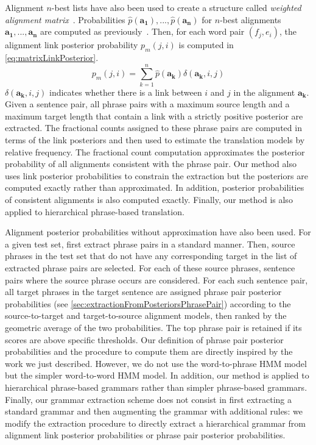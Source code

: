 Alignment $n$-best lists have also been used to create a
structure called
\emph{weighted alignment matrix}~\citep{liu-xia-xiao-liu:2009:EMNLP}.
Probabilities $\hat{p}(\bm{a_1}), ..., \hat{p}(\bm{a_n})$
for $n$-best alignments $\bm{a_1}, ..., \bm{a_n}$ are computed
as previously~\citep{venugopal-zollmann-smith-vogel:2008:AMTA}.
Then, for each word pair $(f_j, e_i)$, the alignment link posterior
probability $p_m(j, i)$ is computed in \autoref{eq:matrixLinkPosterior}.
%
\begin{equation}
  p_m(j, i) = \sum_{k = 1}^n \hat{p}(\bm{a_k}) \delta(\bm{a_k}, i, j)
  \label{eq:matrixLinkPosterior}
\end{equation}
%
$\delta(\bm{a_k}, i, j)$ indicates whether there is a link between $i$ and
$j$ in the alignment $\bm{a_k}$. Given a sentence pair, all phrase
pairs with a maximum source length and a maximum target length that
contain a link with a strictly positive posterior are extracted. The
fractional counts assigned to these phrase pairs are computed in terms
of the link posteriors and then used to estimate the translation models
by relative frequency. The fractional count computation approximates
the posterior probability of all alignments consistent with the phrase
pair. Our method also uses link posterior probabilities
to constrain the extraction but the posteriors are computed
exactly rather than approximated. In addition, posterior probabilities
of consistent alignments is also computed exactly. Finally, our method
is also applied to hierarchical phrase-based translation.

Alignment posterior probabilities without approximation have also been
used.
For a given test set, \citet{deng-and-byrne:2008:ASLP} first extract
phrase pairs in a standard manner. Then, source phrases in the test set
that do not have any corresponding target in the list of extracted
phrase pairs are selected. For each of these source phrases, sentence
pairs where the source phrase occurs are considered. For each such
sentence pair, all target phrases in the target sentence are assigned
phrase pair posterior
probabilities (see \autoref{sec:extractionFromPosteriorsPhrasePair})
according to the
source-to-target and target-to-source alignment models, then ranked
by the geometric average of the two probabilities. The top phrase pair
is retained if its scores are above specific thresholds.
Our definition of phrase pair posterior probabilities and the procedure to compute
them are directly inspired by the work we just described. However, we do not use
the word-to-phrase HMM model but the simpler word-to-word HMM model.
In addition, our method is applied to hierarchical phrase-based grammars
rather than simpler phrase-based grammars. Finally, our grammar
extraction scheme does not consist in
first extracting a standard grammar and then augmenting the grammar with additional rules: we
modify the extraction procedure to directly extract a hierarchical
grammar from alignment link posterior probabilities
or phrase pair posterior probabilities.

